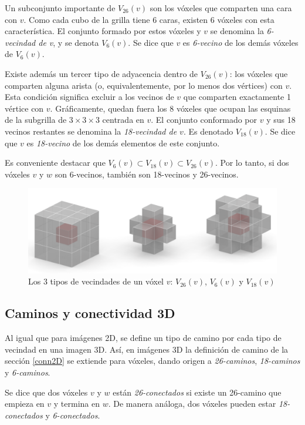 Un subconjunto importante de $V_{26}(v)$ son los vóxeles que comparten una cara con $v$. Como cada cubo de la grilla tiene 6 caras, existen 6 vóxeles con esta característica. El conjunto formado por estos vóxeles y $v$ se denomina la \textit{6-vecindad de v}, y se denota $V_6(v)$. Se dice que $v$ es \textit{6-vecino} de los demás vóxeles de $V_6(v)$.

Existe además un tercer tipo de adyacencia dentro de $V_{26}(v)$: los vóxeles que comparten alguna arista (o, equivalentemente, por lo menos dos vértices) con $v$. Esta condición significa excluir a los vecinos de $v$ que comparten exactamente 1 vértice con $v$. Gráficamente, quedan fuera los 8 vóxeles que ocupan las esquinas de la subgrilla de $3\times3\times3$ centrada en $v$. El conjunto conformado por $v$ y sus 18 vecinos restantes se denomina la \textit{18-vecindad de $v$}. Es denotado $V_{18}(v)$. Se dice que $v$ es \textit{18-vecino} de los demás elementos de este conjunto. 

Es conveniente destacar que $V_{6}(v) \subset V_{18}(v) \subset V_{26}(v)$. Por lo tanto, si dos vóxeles $v$ y $w$ son 6-vecinos, también son 18-vecinos y 26-vecinos.

\begin{figure}[ht]\centering
\includegraphics[width=0.8\linewidth]{images/3dneighborhoods}
\caption{Los 3 tipos de vecindades de un vóxel $v$: $V_{26}(v)$, $V_{6}(v)$ y $V_{18}(v)$}
\label{fig:3dneighborhoods}
\end{figure}

\subsection{Caminos y conectividad 3D}

Al igual que para imágenes 2D, se define un tipo de camino por cada tipo de vecindad en una imagen 3D. Así, en imágenes 3D la definición de camino de la sección \ref{conn2D} se extiende para vóxeles, dando origen a \textit{26-caminos}, \textit{18-caminos} y \textit{6-caminos}.

Se dice que dos vóxeles $v$ y $w$ están \textit{26-conectados} si existe un 26-camino que empieza en $v$ y termina en $w$. De manera análoga, dos vóxeles pueden estar \textit{18-conectados} y \textit{6-conectados}.

